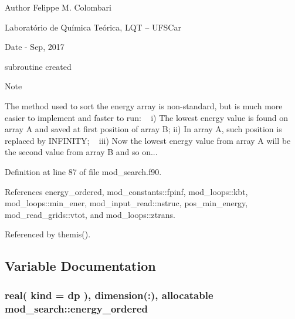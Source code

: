 \begin{DoxyAuthor}{Author}
Felippe M. Colombari
\begin{DoxyItemize}
\item Laboratório de Química Teórica, L\+QT -- U\+F\+S\+Car 
\end{DoxyItemize}
\end{DoxyAuthor}
\begin{DoxyDate}{Date}
-\/ Sep, 2017
\begin{DoxyItemize}
\item subroutine created 
\end{DoxyItemize}
\end{DoxyDate}
\begin{DoxyNote}{Note}
~\newline

\begin{DoxyItemize}
\item The method used to sort the energy array is non-\/standard, but is much more easier to implement and faster to run\+: ~\newline
 i) The lowest energy value is found on array A and saved at first position of array B; ii) In array A, such position is replaced by I\+N\+F\+I\+N\+I\+TY; ~\newline
 iii) Now the lowest energy value from array A will be the second value from array B and so on... 
\end{DoxyItemize}
\end{DoxyNote}


Definition at line 87 of file mod\+\_\+search.\+f90.



References energy\+\_\+ordered, mod\+\_\+constants\+::fpinf, mod\+\_\+loops\+::kbt, mod\+\_\+loops\+::min\+\_\+ener, mod\+\_\+input\+\_\+read\+::nstruc, pos\+\_\+min\+\_\+energy, mod\+\_\+read\+\_\+grids\+::vtot, and mod\+\_\+loops\+::ztrans.



Referenced by themis().



\subsection{Variable Documentation}
\subsubsection[{\texorpdfstring{energy\+\_\+ordered}{energy_ordered}}]{\setlength{\rightskip}{0pt plus 5cm}real( kind = dp ), dimension(\+:), allocatable mod\+\_\+search\+::energy\+\_\+ordered}\hypertarget{namespacemod__search_a8ce72764a5658f7958ed5c473dd77706}{}\label{namespacemod__search_a8ce72764a5658f7958ed5c473dd77706}


